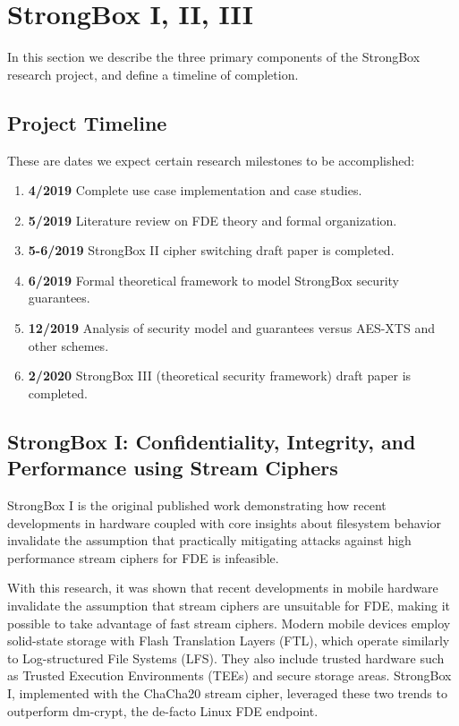 \chapter{StrongBox I, II, III} \label{chp:strongbox}

In this section we describe the three primary components of the StrongBox
research project, and define a timeline of completion.

\section{Project Timeline}

These are dates we expect certain research milestones to be accomplished:

\begin{enumerate}
    \item \textbf{4/2019} Complete use case implementation and case studies.
    \item \textbf{5/2019} Literature review on FDE theory and formal
    organization.
    \item \textbf{5-6/2019} StrongBox II cipher switching draft paper is
    completed.
    \item \textbf{6/2019} Formal theoretical framework to model StrongBox
    security guarantees.
    \item \textbf{12/2019} Analysis of security model and guarantees versus
    AES-XTS and other schemes.
    \item \textbf{2/2020} StrongBox III (theoretical security framework) draft
    paper is completed.
\end{enumerate}

\section{StrongBox I: Confidentiality, Integrity, and Performance using Stream Ciphers}

StrongBox I is the original published work demonstrating how recent developments
in hardware coupled with core insights about filesystem behavior invalidate the
assumption that practically mitigating attacks against high performance stream
ciphers for FDE is infeasible.

With this research, it was shown that recent developments in mobile hardware
invalidate the assumption that stream ciphers are unsuitable for FDE, making it
possible to take advantage of fast stream ciphers. Modern mobile devices employ
solid-state storage with Flash Translation Layers (FTL), which operate similarly
to Log-structured File Systems (LFS). They also include trusted hardware such as
Trusted Execution Environments (TEEs) and secure storage areas. StrongBox I,
implemented with the ChaCha20 stream cipher, leveraged these two trends to
outperform dm-crypt, the de-facto Linux FDE endpoint.

